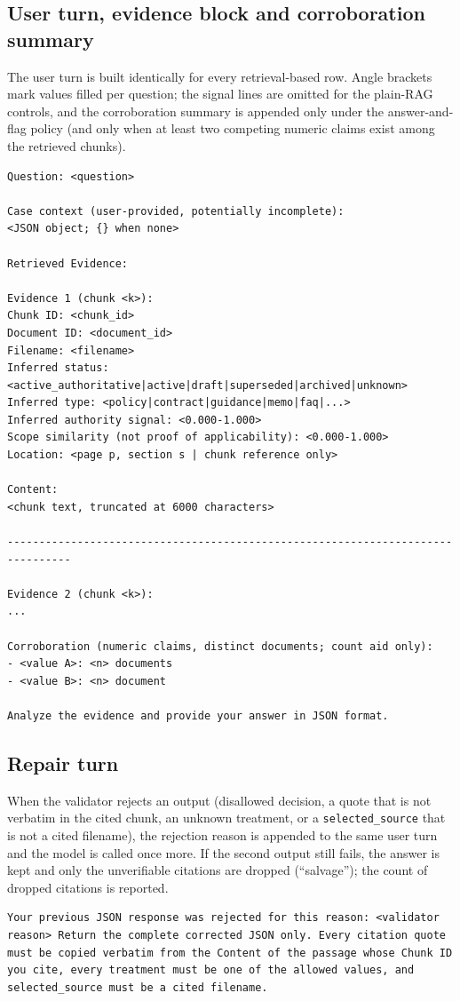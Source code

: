 \documentclass[11pt]{article}
\begin{document}
\subsection{User turn, evidence block and corroboration summary}
\label{app:user-turn}
The user turn is built identically for every retrieval-based row. Angle
brackets mark values filled per question; the signal lines are omitted for the
plain-RAG controls, and the corroboration summary is appended only under the
answer-and-flag policy (and only when at least two competing numeric claims
exist among the retrieved chunks).
\begin{lstlisting}[style=prompt]
Question: <question>

Case context (user-provided, potentially incomplete):
<JSON object; {} when none>

Retrieved Evidence:

Evidence 1 (chunk <k>):
Chunk ID: <chunk_id>
Document ID: <document_id>
Filename: <filename>
Inferred status: <active_authoritative|active|draft|superseded|archived|unknown>
Inferred type: <policy|contract|guidance|memo|faq|...>
Inferred authority signal: <0.000-1.000>
Scope similarity (not proof of applicability): <0.000-1.000>
Location: <page p, section s | chunk reference only>

Content:
<chunk text, truncated at 6000 characters>

--------------------------------------------------------------------------------

Evidence 2 (chunk <k>):
...

Corroboration (numeric claims, distinct documents; count aid only):
- <value A>: <n> documents
- <value B>: <n> document

Analyze the evidence and provide your answer in JSON format.
\end{lstlisting}

\subsection{Repair turn}
\label{app:repair}
When the validator rejects an output (disallowed decision, a quote that is not
verbatim in the cited chunk, an unknown treatment, or a \texttt{selected\_source}
that is not a cited filename), the rejection reason is appended to the same
user turn and the model is called once more. If the second output still fails,
the answer is kept and only the unverifiable citations are dropped (``salvage'');
the count of dropped citations is reported.
\begin{lstlisting}[style=prompt]
Your previous JSON response was rejected for this reason: <validator reason> Return the complete corrected JSON only. Every citation quote must be copied verbatim from the Content of the passage whose Chunk ID you cite, every treatment must be one of the allowed values, and selected_source must be a cited filename.
\end{lstlisting}
\end{document}

